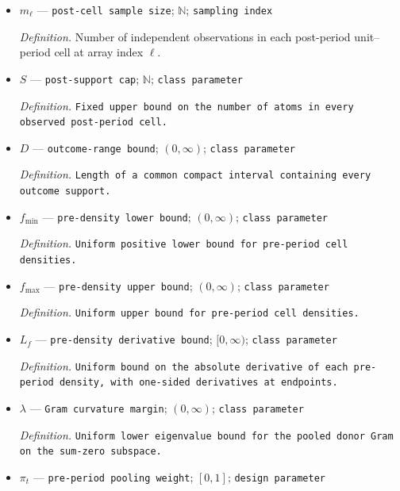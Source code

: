 \documentclass{article}
\begin{document}
\begin{itemize}
  \par\smallskip\noindent\emph{Definition.} Number of independent observations in each pre-period unit--period cell at array index \(\ell\).
  \item \(m_\ell\) --- \texttt{post-\allowbreak{}cell sample size}; \(\mathbb N\); \texttt{sampling index}
  \par\smallskip\noindent\emph{Definition.} Number of independent observations in each post-period unit--period cell at array index \(\ell\).
  \item \(S\) --- \texttt{post-\allowbreak{}support cap}; \(\mathbb N\); \texttt{class parameter}
  \par\smallskip\noindent\emph{Definition.} \texttt{Fixed upper bound on the number of atoms in every observed post-\allowbreak{}period cell.}
  \item \(D\) --- \texttt{outcome-\allowbreak{}range bound}; \((0,\infty)\); \texttt{class parameter}
  \par\smallskip\noindent\emph{Definition.} \texttt{Length of a common compact interval containing every outcome support.}
  \item \(f_{\min}\) --- \texttt{pre-\allowbreak{}density lower bound}; \((0,\infty)\); \texttt{class parameter}
  \par\smallskip\noindent\emph{Definition.} \texttt{Uniform positive lower bound for pre-\allowbreak{}period cell densities.}
  \item \(f_{\max}\) --- \texttt{pre-\allowbreak{}density upper bound}; \((0,\infty)\); \texttt{class parameter}
  \par\smallskip\noindent\emph{Definition.} \texttt{Uniform upper bound for pre-\allowbreak{}period cell densities.}
  \item \(L_f\) --- \texttt{pre-\allowbreak{}density derivative bound}; \([0,\infty)\); \texttt{class parameter}
  \par\smallskip\noindent\emph{Definition.} \texttt{Uniform bound on the absolute derivative of each pre-\allowbreak{}period density,\allowbreak{} with one-\allowbreak{}sided derivatives at endpoints.}
  \item \(\lambda\) --- \texttt{Gram curvature margin}; \((0,\infty)\); \texttt{class parameter}
  \par\smallskip\noindent\emph{Definition.} \texttt{Uniform lower eigenvalue bound for the pooled donor Gram on the sum-\allowbreak{}zero subspace.}
  \item \(\pi_t\) --- \texttt{pre-\allowbreak{}period pooling weight}; \([0,1]\); \texttt{design parameter}

\end{itemize}
\end{document}
